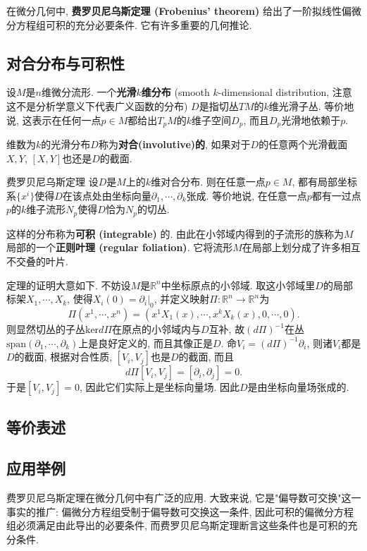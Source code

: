 
在微分几何中, \textbf{费罗贝尼乌斯定理 (Frobenius' theorem)} 给出了一阶拟线性偏微分方程组可积的充分必要条件. 它有许多重要的几何推论.

\subsection{对合分布与可积性}
设$M$是$n$维微分流形. 一个\textbf{光滑$k$维分布} (smooth $k$-dimensional distribution, 注意这不是分析学意义下代表广义函数的分布) $D$是指切丛$TM$的$k$维光滑子丛. 等价地说, 这表示在任何一点$p\in M$都给出$T_pM$的$k$维子空间$D_p$, 而且$D_p$光滑地依赖于$p$. 

维数为$k$的光滑分布$D$称为\textbf{对合(involutive)的}, 如果对于$D$的任意两个光滑截面$X,Y$, $[X,Y]$也还是$D$的截面. 

\begin{theorem}{费罗贝尼乌斯定理}
设$D$是$M$上的$k$维对合分布. 则在任意一点$p\in M$, 都有局部坐标系$\{x^i\}$使得$D$在该点处由坐标向量$\partial_1,\cdots ,\partial_k$张成. 等价地说, 在任意一点$p$都有一过点$p$的$k$维子流形$N_p$使得$D$恰为$N_p$的切丛.
\end{theorem}
这样的分布称为\textbf{可积 (integrable)} 的. 由此在小邻域内得到的子流形的族称为$M$局部的一个\textbf{正则叶理 (regular foliation)}. 它将流形$M$在局部上划分成了许多相互不交叠的叶片.

定理的证明大意如下. 不妨设$M$是$\mathbb{R}^n$中坐标原点的小邻域. 取这小邻域里$D$的局部标架$X_1,\cdots ,X_k$, 使得$X_i(0)=\partial_i|_0$, 并定义映射$\Pi: \mathbb{R}^n\to \mathbb{R}^n$为
$$
\Pi(x^1,\cdots ,x^n)=(x^1X_1(x),\cdots ,x^kX_k(x),0,\cdots ,0).
$$
则显然切丛的子丛$\text{ker}d\Pi$在原点的小邻域内与$D$互补, 故$(d\Pi)^{-1}$在丛$\text{span}(\partial_1,\cdots ,\partial_k)$上是良好定义的, 而且其像正是$D$. 命$V_i=(d\Pi)^{-1}\partial_i$, 则诸$V_i$都是$D$的截面, 根据对合性质, $[V_i,V_j]$也是$D$的截面, 而且
$$
d\Pi[V_i,V_j]=[\partial_i,\partial_j]=0.
$$
于是$[V_i,V_j]=0$, 因此它们实际上是坐标向量场. 因此$D$是由坐标向量场张成的. 

\subsection{等价表述}

\subsection{应用举例}
费罗贝尼乌斯定理在微分几何中有广泛的应用. 大致来说, 它是"偏导数可交换"这一事实的推广: 偏微分方程组受制于偏导数可交换这一条件, 因此可积的偏微分方程组必须满足由此导出的必要条件, 而费罗贝尼乌斯定理断言这些条件也是可积的充分条件.

